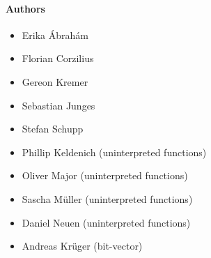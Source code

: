 \documentclass{article}
\begin{document}
\paragraph{Authors}
\begin{itemize}
\item Erika \'Abrah\'am
\item Florian Corzilius
\item Gereon Kremer
\item Sebastian Junges
\item Stefan Schupp
\item Phillip Keldenich (uninterpreted functions)
\item Oliver Major (uninterpreted functions)
\item Sascha M\"uller (uninterpreted functions)
\item Daniel Neuen (uninterpreted functions)
\item Andreas Kr\"uger (bit-vector)
\end{itemize}


  
\end{document}
